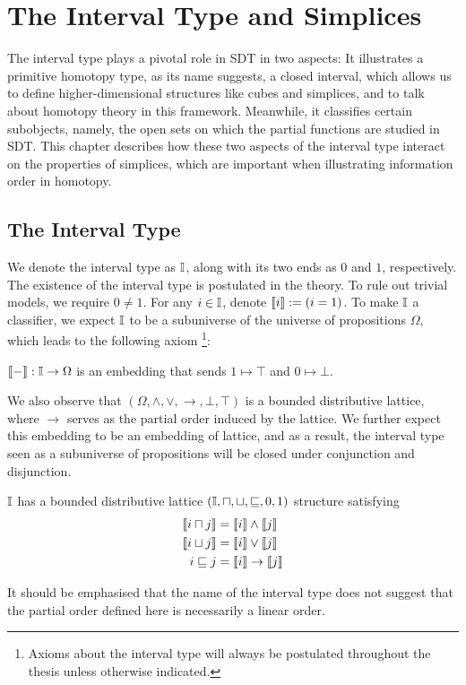 
\chapter{The Interval Type and Simplices}
\label{chapter-interval}

The interval type plays a pivotal role in SDT in two aspects: It illustrates a primitive homotopy type, as its name suggests, a closed interval, which allows us to define higher-dimensional structures like cubes and simplices, and to talk about homotopy theory in this framework. Meanwhile, it classifies certain subobjects, namely, the open sets on which the partial functions are studied in SDT. This chapter describes how these two aspects of the interval type interact on the properties of simplices, which are important when illustrating information order in homotopy.

\section{The Interval Type}

We denote the interval type as $\mathbb{I}$, along with its two ends as $0$ and $1$, respectively. The existence of the interval type is postulated in the theory. To rule out trivial models, we require $0\ne1$. For any $i\in\mathbb{I}$, denote $\left\llbracket i\right\rrbracket:=(i=1)$. To make $\mathbb{I}$ a classifier, we expect $\mathbb{I}$ to be a subuniverse of the universe of propositions $\Omega$, which leads to the following axiom \footnote{Axioms about the interval type will always be postulated throughout the thesis unless otherwise indicated.}:
\begin{axiom}
    \label{ax-prop}
    $\left\llbracket-\right\rrbracket:\mathbb{I}\to\Omega$ is an embedding that sends $1\mapsto\top$ and $0\mapsto\bot$.
\end{axiom}

We also observe that $(\Omega,\wedge,\vee,\to,\bot,\top)$ is a bounded distributive lattice, where $\to$ serves as the partial order induced by the lattice. We further expect this embedding to be an embedding of lattice, and as a result, the interval type seen as a subuniverse of propositions will be closed under conjunction and disjunction. 
\begin{axiom}
    \label{ax-lattice}
    $\mathbb{I}$ has a bounded distributive lattice $(\mathbb{I},\sqcap,\sqcup,\sqsubseteq,0,1)$ structure satisfying
    $$\begin{aligned}
        \left\llbracket i\sqcap j\right\rrbracket&=\left\llbracket i\right\rrbracket\wedge\left\llbracket j\right\rrbracket \\
        \left\llbracket i\sqcup j\right\rrbracket&=\left\llbracket i\right\rrbracket\vee\left\llbracket j\right\rrbracket \\
        i\sqsubseteq j&=\left\llbracket i\right\rrbracket\to\left\llbracket j\right\rrbracket \\
    \end{aligned}$$
\end{axiom}
It should be emphasised that the name of the interval type does not suggest that the partial order defined here is necessarily a linear order.

